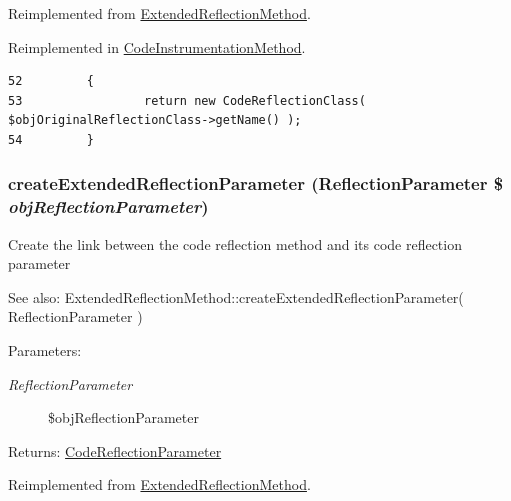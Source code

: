 Reimplemented from \hyperlink{class_extended_reflection_method_6b56ec198bc6a5b5a72076e4e7c19e29}{ExtendedReflectionMethod}.

Reimplemented in \hyperlink{class_code_instrumentation_method_6b56ec198bc6a5b5a72076e4e7c19e29}{CodeInstrumentationMethod}.

\begin{Code}\begin{verbatim}52         {
53                 return new CodeReflectionClass( $objOriginalReflectionClass->getName() );
54         }
\end{verbatim}
\end{Code}


\hypertarget{class_code_reflection_method_98ceb248f2b535a3a83ac2e7990e0c1f}{
\subsubsection[{createExtendedReflectionParameter}]{\setlength{\rightskip}{0pt plus 5cm}createExtendedReflectionParameter (ReflectionParameter \$ {\em objReflectionParameter})}}
\label{class_code_reflection_method_98ceb248f2b535a3a83ac2e7990e0c1f}


Create the link between the code reflection method and its code reflection parameter

\begin{Desc}
\item[See also:]ExtendedReflectionMethod::createExtendedReflectionParameter( ReflectionParameter ) \end{Desc}
\begin{Desc}
\item[Parameters:]
\begin{description}
\item[{\em ReflectionParameter}]\$objReflectionParameter \end{description}
\end{Desc}
\begin{Desc}
\item[Returns:]\hyperlink{class_code_reflection_parameter}{CodeReflectionParameter} \end{Desc}


Reimplemented from \hyperlink{class_extended_reflection_method_98ceb248f2b535a3a83ac2e7990e0c1f}{ExtendedReflectionMethod}.

